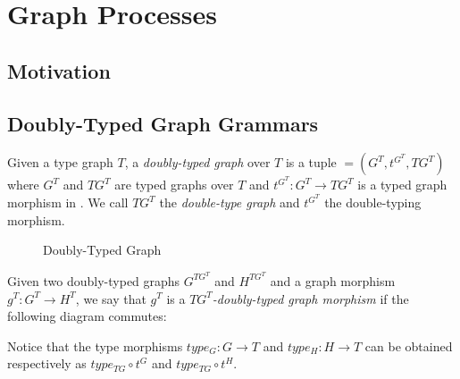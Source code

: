 \chapter{Graph Processes}

\section{Motivation}

\section{Doubly-Typed Graph Grammars}

\begin{definition} Given a type graph $T$, a \emph{doubly-typed graph} \doublyTypedGraph{} over $T$ is a tuple \doublyTypedGraph $= \left(G^T, t^{G^T},TG^T\right)$ where $G^T$ and $TG^T$ are typed graphs over $T$ and \mbox{$t^{G^T} : G^T \rightarrow TG^T$} is a typed graph morphism in \typedGraphCategory{}. We call $TG^T$ the \emph{double-type graph} and $t^{G^T}$ the double-typing morphism.

\end{definition}

\begin{example}

\begin{figure}
  \centering
  
  \caption{Doubly-Typed Graph}\label{fig:process:doubly-typed-graph}
\end{figure}

\end{example}

\begin{definition}
  Given two doubly-typed graphs $G^{TG^T}$ and $H^{TG^T}$ and a graph morphism $g^T : G^T \rightarrow H^T$, we say that $g^T$ is a \emph{$TG^T$-doubly-typed graph morphism} if the following diagram commutes:

\end{definition}

Notice that the type morphisms $type_G : G \rightarrow T$ and $type_H : H \rightarrow T$ can be obtained respectively as $type_{TG} \circ t^G$ and $type_{TG} \circ t^H$.

